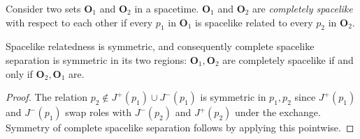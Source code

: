 \medskip

\begin{definition}
    \label{def:completely-spacelike}
    \leanok
    Consider two sets $\mathbf{O}_1$ and $\mathbf{O}_2$ in a spacetime. $\mathbf{O}_1$ and $\mathbf{O}_2$ are \textit{completely spacelike}  with respect to each other if every $p_1$ in $\mathbf{O}_1$ is spacelike related to every $p_2$ in $\mathbf{O}_2$.
\end{definition}

\medskip

\begin{lemma}
    \label{lmm:completely-spacelike-symm}
    \leanok
    Spacelike relatedness is symmetric, and consequently complete spacelike separation is symmetric in its two regions: $\mathbf{O}_1, \mathbf{O}_2$ are completely spacelike if and only if $\mathbf{O}_2, \mathbf{O}_1$ are.
\end{lemma}
\begin{proof}
    \leanok
    The relation $p_2 \notin J^+(p_1) \cup J^-(p_1)$ is symmetric in $p_1, p_2$ since $J^+(p_1)$ and $J^-(p_1)$ swap roles with $J^-(p_2)$ and $J^+(p_2)$ under the exchange. Symmetry of complete spacelike separation follows by applying this pointwise.
\end{proof}

\medskip

